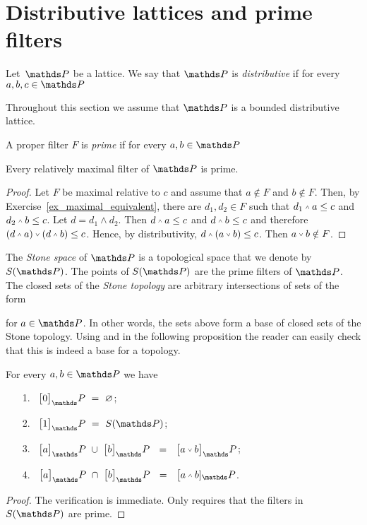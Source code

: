 \documentclass[creche.tex]{subfiles}
\begin{document}
\section{Distributive lattices and prime filters}\label{prime_filters}

Let\ $\PP$ be a lattice.
We say that $\PP$ is \emph{distributive\/} if for every $a,b,c\in\PP$



Throughout this section we assume that $\PP$ is a bounded distributive lattice.

A proper filter $F$ is \emph{prime\/} if for every $a,b\in\PP$


\begin{proposition}\label{prop_massimalisonoprimi}
Every relatively maximal filter of\/ $\PP$ is prime.
\end{proposition}

\begin{proof}
Let $F$ be maximal relative to $c$ and assume that $a\notin F$ and $b\notin F$.
Then, by Exercise~\ref{ex_maximal_equivalent}, there are $d_1, d_2\in F$ such that $d_1\swedge a\le c$ and $d_2\swedge b\le c$.
Let $d=d_1\wedge d_2$.
Then  $d\swedge a\le c$ and $d\swedge b\le c$ and therefore $(d\swedge a)\svee(d\swedge b)\le c$.
Hence, by distributivity, $d\swedge (a\svee b)\le c$.
Then $a\svee b\notin F$.
\end{proof}

The \emph{Stone space\/} of $\PP$ is a topological space that we denote by \emph{$S(\PP)$}.
The points of \emph{$S(\PP)$} are the prime filters of $\PP$.
The closed sets of the \emph{Stone topology} are arbitrary intersections of sets of the form


for $a\in\PP$.
In other words, the sets above form a base of closed sets of the Stone topology.
Using  and  in the following proposition the reader can easily check that this is indeed a base for a topology.

\begin{proposition}\label{prop_brouwerstopology}
For every $a,b\in\PP$ we have
\begin{itemize}
\item[1.]\ $\big[0\big]_\PP\ =\ \0$;
\item[2.]\ $\big[1\big]_\PP\ =\ S(\PP)$;
\item[3.]\ $\big[a\big]_\PP\ \cup\ \big[b\big]_\PP\ \ =\ \ \big[a\svee b\big]_\PP$;
\item[4.]\ $\big[a\big]_\PP\ \cap\ \big[b\big]_\PP\ \ =\ \ \big[a\swedge b]_\PP$.
\end{itemize}
\end{proposition}
\begin{proof}
The verification is immediate.
Only  requires that the filters in $S(\PP)$ are prime.
\end{proof}
\end{document}
